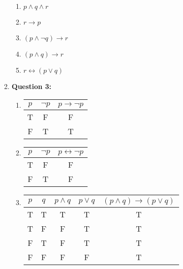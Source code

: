 \documentclass[11pt]{article}
\begin{document}
\begin{enumerate}
\begin{enumerate}[label=(\alph*)]
            \item
            $p \land q \land r$
            
            \item
            $r \rightarrow p$
            
            \item
            $(p \land \lnot q) \rightarrow r$
            
            \item
            $(p \land q) \rightarrow r$
            
            \item
            $r \leftrightarrow (p \vee q)$
            
        \end{enumerate}
    
    \item
        \textbf{Question 3:}
        
        \begin{enumerate}[label=(\alph*)]
            \item 
                \begin{tabular}{|c|c|c|}
                    \hline
                    $p$ & $\lnot p$ & $p \rightarrow \lnot p$\\
                    \hline
                    T & F & F\\
                    F & T & T\\
                    \hline
                \end{tabular}
                
            \item
                \begin{tabular}{|c|c|c|}
                    \hline
                    $p$ & $\lnot p$ & $p \leftrightarrow \lnot p$\\
                    \hline
                    T & F & F\\
                    F & T & F\\
                    \hline
                \end{tabular}
                
            \item
                \begin{tabular}{|c|c|c|c|c|}
                    \hline
                    $p$ & $q$ & $p \land q$ & $p \vee q$ & $(p \land q) \rightarrow (p \vee q)$\\
                    \hline
                    T & T & T & T & T\\
                    T & F & F & T & T\\
                    F & T & F & T & T\\
                    F & F & F & F & T\\
                    \hline
                \end{tabular}
                

\end{enumerate}
\end{enumerate}
\end{document}

